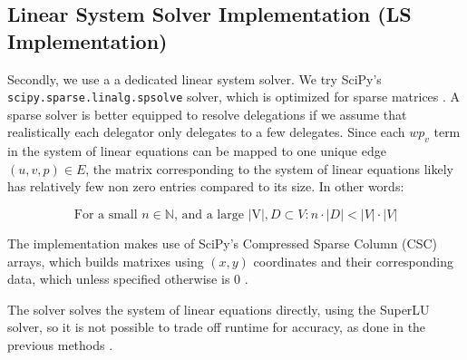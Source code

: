 \subsection{Linear System Solver Implementation (LS Implementation)}

Secondly, we use a a dedicated linear system solver. We try SciPy's \texttt{scipy.sparse.linalg.spsolve} solver, which is optimized for sparse matrices \cite{virtanenSciPy10Fundamental2020}. A sparse solver is better equipped to resolve delegations if we assume that realistically each delegator only delegates to a few delegates. Since each $wp_v$ term in the system of linear equations can be mapped to one unique edge $(u, v, p) \in E$, the matrix corresponding to the system of linear equations likely has relatively few non zero entries compared to its size. In other words:

\[
\text{For a small } n \in \mathbb{N} \text{, and a large |V|}, D \subset V: n \cdot |D| < |V| \cdot |V|
\]

 
 The implementation makes use of SciPy's Compressed Sparse Column (CSC) arrays, which builds matrixes using $(x,y)$ coordinates and their corresponding data, which unless specified otherwise is 0 \cite{virtanenSciPy10Fundamental2020}. 

The solver solves the system of linear equations directly, using the SuperLU solver, so it is not possible to trade off runtime for accuracy, as done in the previous methods \cite{liSuperLUUsersGuide1999}. 


